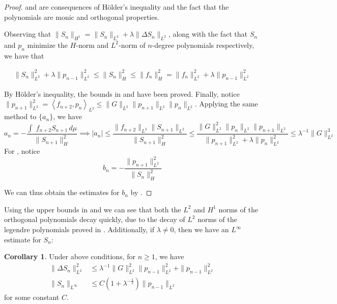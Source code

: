\documentclass[12pt]{amsart}
\makeatletter
\renewcommand*{\eqref}[1]{%
  \hyperref[{#1}]{\textup{\tagform@{\ref*{#1}}}}%
}
\theoremstyle{plain}
\theoremstyle{definition}
\newtheorem{corollary}{Corollary}[section]
\newcommand{\inner}[2]{\left \langle #1, #2\right \rangle}
\newcommand{\lap}{\Delta}
\makeatother
\begin{document}
\begin{proof}
\eqref{SobolevL2Estimate} and \eqref{SobolevH1Estimate} are consequences of H\"older's inequality and the fact that the polynomials are monic and orthogonal properties. 



Observing that $\|S_{n}\|_{H^1} = \|S_{n}\|_{L^2} + \lambda\|\Delta S_{n}\|_{L^2}$, along with the fact that $S_n$ and $p_n$ minimize the $H$-norm and $L^2$-norm of $n$-degree polynomials respectively, we have that 

\begin{align}
    \|S_n\|^2_{L^2}+\lambda\|p_{n-1}\|_{L^2}^2\le\|S_n\|_{H}^2\le \|f_n\|_{H}^2=\|f_n\|_{L^2}^2+\lambda\|p_{n-1}\|_{L^2}^2 \label{equation that yields H1 and L2 estimate}
\end{align}

By H\"older's inequality, the bounds in \eqref{SobolevH1Estimate} and \eqref{SobolevL2Estimate} have been proved. Finally, notice $\|p_{n+1}\|^2_{L^2}=\inner{f_{n+2}}{p_n}_{L^2}\le \|G\|_{L^2}\|p_{n+1}\|_{L^2}\|p_n\|_{L^2}$. Applying the same method to $\{a_n\}$, we have
$$a_n=-\frac{\int\;f_{n+2}S_{n+1}\,d\mu}{\|S_{n+1}\|_H^2} \implies |a_n|\le
\frac{\|f_{n+2}\|_{L^2}\|S_{n+1}\|_{L^2}}{\|S_{n+1}\|_H^2}\le \frac{\|G\|_{L^2}^2\|p_n\|_{L^2}\|p_{n+1}\|_{L^2}}{\|p_{n+1}\|_{L^2}^2+ \lambda \|p_n\|_{L^2}^2}
\le \lambda^{-1}\|G\|_{L^2}^3$$ For \eqref{bnbounds}, notice 
$$b_n=-\frac{\|p_{n+1}\|_{L^2}^2}{\|S_{n}\|_H^2}$$ 

We can thus obtain the estimates for $b_n$ by \eqref{SobolevH1Estimate}.

\end{proof}

Using the upper bounds in \eqref{SobolevL2Estimate} and \eqref{SobolevH1Estimate} we can see that both the $L^2$ and $H^1$ norms of the orthogonal polynomials decay quickly, due to the decay of $L^2$ norms of the legendre polynomials proved in \cite{OST}. Additionally, if $\lambda\neq0$, then we have an $L^\infty$ estimate for $S_n$:

\begin{corollary}\label{Corollary: laplacian-L2 and Linfinity estimates}
Under above conditions, for $n \ge 1$, we have 
\begin{align}
    \|\lap S_n\|_{L^2}^2&\le \lambda^{-1}\|G\|_{L^2}^2\|p_{n-1}\|_{L^2}^2+\|p_{n-1}\|_{L^2}^2 \label{L2EstimateofSobolevLaplacian}\\
\|S_n\|_{L^{\infty}}&\le C(1+\lambda^{-\frac12})\|p_{n-1}\|_{L^2} \label{LinfinityEstimateofSobolev}
\end{align}
for some constant $C$.
\end{corollary}
\end{document}
